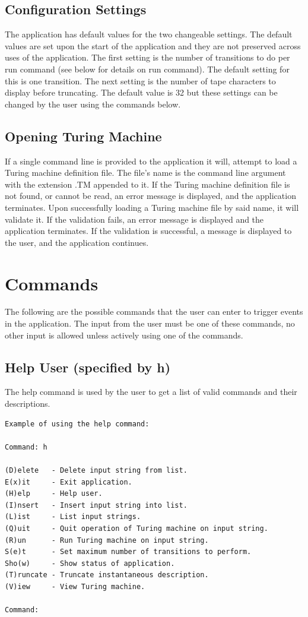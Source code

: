 \documentclass{report}
\begin{document}
\subsection{Configuration Settings} 
The application has default values for the two changeable settings. The default values are set upon the start of the application and they are not preserved across uses of the application. The first setting is the number of transitions to do per run command (see below for details on run command). The default setting for this is one transition. The next setting is the number of tape characters to display before truncating. The default value is 32 but these settings can be changed by the user using the commands below. 

\subsection{Opening Turing Machine} 
If a single command line is provided to the application it will, attempt to load a Turing machine definition file. The file's name is the command line argument with the extension .TM appended to it. If the Turing machine definition file is not found, or cannot be read, an error message is displayed, and the application terminates. Upon successfully loading a Turing machine file by said name, it will validate it. If the validation fails, an error message is displayed and the application terminates. If the validation is successful, a message is displayed to the user, and the application continues.

\section{Commands}

The following are the possible commands that the user can enter to trigger events in the application. The input from the user must be one of these commands, no other input is allowed unless actively using one of the commands.

\subsection{Help User (specified by h)} 

The help command is used by the user to get a list of valid commands and their descriptions. 

\begin{verbatim}
Example of using the help command:

Command: h

(D)elete   - Delete input string from list.
E(x)it     - Exit application.
(H)elp     - Help user.
(I)nsert   - Insert input string into list.
(L)ist     - List input strings.
(Q)uit     - Quit operation of Turing machine on input string. 
(R)un      - Run Turing machine on input string.
S(e)t      - Set maximum number of transitions to perform. 
Sho(w)     - Show status of application.
(T)runcate - Truncate instantaneous description.
(V)iew     - View Turing machine.

Command: 
\end{verbatim}
\end{document}
